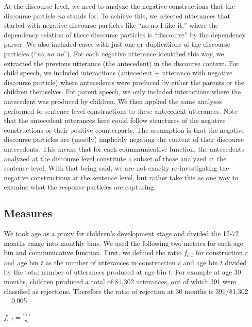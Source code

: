 \documentclass[
  english,
  man,floatsintext]{apa6}
\begin{document}
At the discourse level, we need to analyze the negative constructions that the discourse particle \emph{no} stands for. To achieve this, we selected utterances that started with negative discourse particles like ``no no I like it,'' where the dependency relation of these discourse particles is ``discourse'' by the dependency parser. We also included cases with just one or duplications of the discourse particles (``\emph{no no no}''). For each negative utterance identified this way, we extracted the previous utterance (the antecedent) in the discourse context. For child speech, we included interactions (antecedent + utterance with negative discourse particle) where antecedents were produced by either the parents or the children themselves. For parent speech, we only included interactions where the antecedent was produced by children. We then applied the same analyses performed to sentence level constructions to these antecedent utterances. Note that the antecedent utterances here could follow structures of the negative constructions or their positive counterparts. The assumption is that the negative discourse particles are (mostly) implicitly negating the content of their discourse antecedents. This means that for each coummunicative function, the antecedents analyzed at the discourse level constitute a subset of those analyzed at the sentence level. With that being said, we are not exactly re-investigating the negative constructions at the sentence level, but rather take this as one way to examine what the response particles are capturing.

\hypertarget{measures}{%
\subsection{Measures}\label{measures}}

We took age as a proxy for children's development stage and divided the 12-72 months range into monthly bins. We used the following two metrics for each age bin and communicative function. First, we defined the ratio \(f_{c,t}\) for construction \(c\) and age bin \(t\) as the number of utterances in construction \(c\) and age bin \(t\) divided by the total number of utterances produced at age bin \(t\). For example at age 30 months, children produced a total of 81,302 utterances, out of which 391 were classified as rejections. Therefore the ratio of rejection at 30 months is 391/81,302 = 0.005.

\(f_{c, t} = \frac{n_{c,t}}{n_{t}}\)
\end{document}
